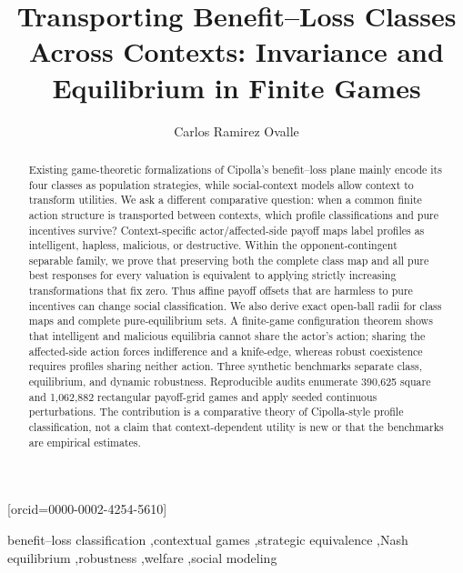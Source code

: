 \documentclass[a4paper,fleqn]{cas-dc}
\theoremstyle{remark}
\begin{document}
\let\WriteBookmarks\relax
\def\floatpagepagefraction{1}
\def\textpagefraction{.001}


\title[mode=title]{Transporting Benefit--Loss Classes Across Contexts:
Invariance and Equilibrium in Finite Games}

\author[1]{Carlos Ramirez Ovalle}[orcid=0000-0002-4254-5610]
\cormark[1]

\begin{abstract}
Existing game-theoretic formalizations of Cipolla's benefit--loss plane mainly encode its four classes as population strategies, while social-context models allow context to transform utilities. We ask a different comparative question: when a common finite action structure is transported between contexts, which profile classifications and pure incentives survive? Context-specific actor/affected-side payoff maps label profiles as intelligent, hapless, malicious, or destructive. Within the opponent-contingent separable family, we prove that preserving both the complete class map and all pure best responses for every valuation is equivalent to applying strictly increasing transformations that fix zero. Thus affine payoff offsets that are harmless to pure incentives can change social classification. We also derive exact open-ball radii for class maps and complete pure-equilibrium sets. A finite-game configuration theorem shows that intelligent and malicious equilibria cannot share the actor's action; sharing the affected-side action forces indifference and a knife-edge, whereas robust coexistence requires profiles sharing neither action. Three synthetic benchmarks separate class, equilibrium, and dynamic robustness. Reproducible audits enumerate 390,625 square and 1,062,882 rectangular payoff-grid games and apply seeded continuous perturbations. The contribution is a comparative theory of Cipolla-style profile classification, not a claim that context-dependent utility is new or that the benchmarks are empirical estimates.
\end{abstract}

\begin{keywords}
benefit--loss classification \sep contextual games \sep strategic equivalence
\sep Nash equilibrium \sep robustness \sep welfare \sep social modeling
\end{keywords}
\end{document}
